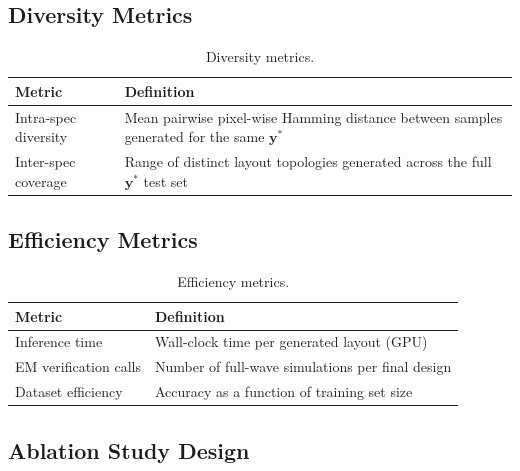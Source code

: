 \documentclass[12pt,a4paper]{article}
\newcommand{\ystar}{\mathbf{y}^{*}}
\theoremstyle{definition}
\theoremstyle{plain}
\theoremstyle{remark}
\begin{document}
\subsection{Diversity Metrics}

\begin{table}[H]
\centering
\caption{Diversity metrics.}
\label{tab:metrics_div}
\begin{tabularx}{\linewidth}{lX}
\toprule
\textbf{Metric} & \textbf{Definition} \\
\midrule
Intra-spec diversity
  & Mean pairwise pixel-wise Hamming distance between samples generated for the same $\ystar$ \\
Inter-spec coverage
  & Range of distinct layout topologies generated across the full $\ystar$ test set \\
\bottomrule
\end{tabularx}
\end{table}

\subsection{Efficiency Metrics}

\begin{table}[H]
\centering
\caption{Efficiency metrics.}
\label{tab:metrics_eff}
\begin{tabularx}{\linewidth}{lX}
\toprule
\textbf{Metric} & \textbf{Definition} \\
\midrule
Inference time           & Wall-clock time per generated layout (GPU) \\
EM verification calls    & Number of full-wave simulations per final design \\
Dataset efficiency       & Accuracy as a function of training set size \\
\bottomrule
\end{tabularx}
\end{table}

\subsection{Ablation Study Design}
\end{document}

